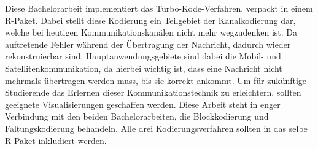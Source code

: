 Diese Bachelorarbeit implementiert das Turbo-Kode-Verfahren, verpackt in einem R-Paket. Dabei stellt diese Kodierung ein Teilgebiet der Kanalkodierung dar, welche bei heutigen Kommunikationskanälen nicht mehr wegzudenken ist. Da auftretende Fehler während der Übertragung der Nachricht, dadurch wieder rekonstruierbar sind. Hauptanwendungsgebiete sind dabei die Mobil- und Satellitenkommunikation, da hierbei wichtig ist, dass eine Nachricht nicht mehrmals übertragen werden muss, bis sie korrekt ankommt. Um für zukünftige Studierende das Erlernen dieser Kommunikationstechnik zu erleichtern, sollten geeignete Visualisierungen geschaffen werden. Diese Arbeit steht in enger Verbindung mit den beiden Bachelorarbeiten, die Blockkodierung und Faltungskodierung behandeln. Alle drei Kodierungsverfahren sollten in das selbe R-Paket inkludiert werden.
